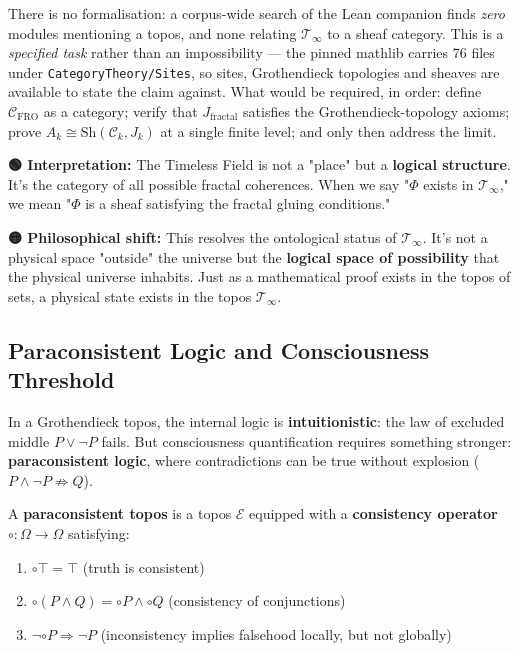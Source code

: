 There is no formalisation: a corpus-wide search of the Lean companion finds
\emph{zero} modules mentioning a topos, and none relating
$\mathcal{T}_\infty$ to a sheaf category. This is a \emph{specified task}
rather than an impossibility --- the pinned mathlib carries 76 files under
\texttt{CategoryTheory/Sites}, so sites, Grothendieck topologies and sheaves are
available to state the claim against. What would be required, in order: define
$\mathcal{C}_{\text{FRO}}$ as a category; verify that $J_{\text{fractal}}$
satisfies the Grothendieck-topology axioms; prove
$A_k \cong \text{Sh}(\mathcal{C}_k, J_k)$ at a single finite level; and only
then address the limit.

\begin{greenbox}
\textbf{🟢 Interpretation:} The Timeless Field is not a "place" but a \textbf{logical structure}. It's the category of all possible fractal coherences. When we say "$\Phi$ exists in $\mathcal{T}_\infty$," we mean "$\Phi$ is a sheaf satisfying the fractal gluing conditions."

\textbf{🟡 Philosophical shift:} This resolves the ontological status of $\mathcal{T}_\infty$. It's not a physical space "outside" the universe but the \textbf{logical space of possibility} that the physical universe inhabits. Just as a mathematical proof exists in the topos of sets, a physical state exists in the topos $\mathcal{T}_\infty$.
\end{greenbox}

\subsection{Paraconsistent Logic and Consciousness Threshold}

In a Grothendieck topos, the internal logic is \textbf{intuitionistic}: the law of excluded middle $P \lor \neg P$ fails. But consciousness quantification requires something stronger: \textbf{paraconsistent logic}, where contradictions can be true without explosion ($P \land \neg P \not\Rightarrow Q$).

\begin{definition}
\label{def:paraconsistent_topos}
A \textbf{paraconsistent topos} is a topos $\mathcal{E}$ equipped with a \textbf{consistency operator} $\circ: \Omega \to \Omega$ satisfying:
\begin{enumerate}
\item $\circ \top = \top$ (truth is consistent)
\item $\circ(P \land Q) = \circ P \land \circ Q$ (consistency of conjunctions)
\item $\neg \circ P \Rightarrow \neg P$ (inconsistency implies falsehood locally, but not globally)
\end{enumerate}
\end{definition}

